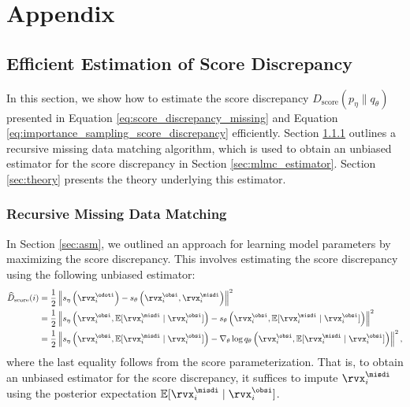 \documentclass{article} %
\begin{document}
\appendix
\section{Appendix}
\subsection{Efficient Estimation of Score Discrepancy}

\label{sec:efficient_estimator}
In this section, we show how to estimate the score discrepancy $D_{\text{score}}(p_{\eta} \| q_{\theta})$ presented in Equation \eqref{eq:score_discrepancy_missing} and Equation \eqref{eq:importance_sampling_score_discrepancy} efficiently. Section \ref{sec:recursive_matching} outlines a recursive missing data matching algorithm, which is used to obtain an unbiased estimator for the score discrepancy in Section \ref{sec:mlmc_estimator}. Section \ref{sec:theory} presents the theory underlying this estimator.

\subsubsection{Recursive Missing Data Matching}
\label{sec:recursive_matching}
In Section \ref{sec:asm}, we outlined an approach for learning model parameters by maximizing the score discrepancy. This involves estimating the score discrepancy using the following unbiased estimator:
\begin{align}
	\widehat{D}_{\text{score}}(i) & = \frac{1}{2} \left\| s_{\eta} \left( \rvx_{i}^{\odoti} \right) - s_{\theta} \left( \rvx_{i}^{\obsi}, \rvx_{i}^{\misdi} \right) \right\|^{2} \notag \\
	&= \frac{1}{2} \left\| s_{\eta} \left( \rvx_{i}^{\obsi}, \mathbb{E}[\rvx_{i}^{\misdi} \mid \rvx_{i}^{\obsi} ] \right) - s_{\theta} \left( \rvx_{i}^{\obsi}, \mathbb{E}[\rvx_{i}^{\misdi} \mid \rvx_{i}^{\obsi} ] \right) \right\|^{2} \notag \\
	&= \frac{1}{2} \left\| s_{\eta} \left( \rvx_{i}^{\obsi}, \mathbb{E}[\rvx_{i}^{\misdi} \mid \rvx_{i}^{\obsi} ] \right) - \nabla_{\theta} \log q_{\theta} \left( \rvx_{i}^{\obsi}, \mathbb{E}[\rvx_{i}^{\misdi} \mid \rvx_{i}^{\obsi} ] \right) \right\|^{2}, \label{eq:recursive_matching}
\end{align}
where the last equality follows from the score parameterization.
That is, to obtain an unbiased estimator for the score discrepancy, it suffices to impute $\rvx_{i}^{\misdi}$ using the posterior expectation $\mathbb{E}[\rvx_{i}^{\misdi} \mid \rvx_{i}^{\obsi} ]$.
\end{document}
